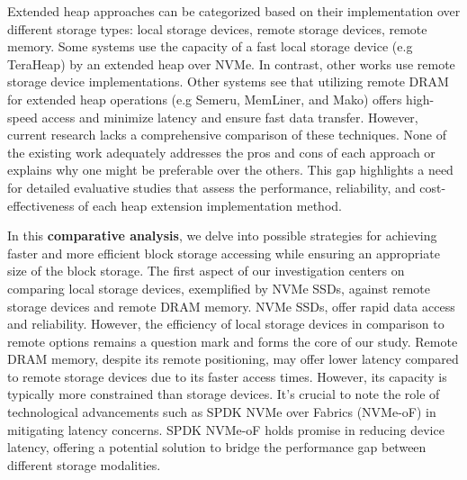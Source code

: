 \documentclass[nonacm,sigplan]{acmart}
\begin{document}
\par Extended heap approaches can be categorized based on their implementation over
different storage types: local storage devices, remote storage devices, remote memory. Some systems use the capacity of a fast local storage device (e.g TeraHeap) by an extended heap over NVMe. In contrast, other works use remote storage device
implementations. Other systems see that utilizing remote DRAM for
extended heap operations (e.g Semeru, MemLiner, and Mako) offers high-speed
access and minimize latency and ensure fast data transfer. However, current research lacks a comprehensive comparison of these
techniques. None of the existing work adequately addresses the pros and cons of
each approach or explains why one might be preferable over the others. This gap
highlights a need for detailed evaluative studies that assess the performance,
reliability, and cost-effectiveness of each heap extension implementation
method.




\par In this \textbf{comparative analysis}, we delve into possible strategies for
achieving faster and more efficient block storage accessing while ensuring an
appropriate size of the block storage. The first aspect of our investigation
centers on comparing local storage devices, exemplified by NVMe SSDs, against
remote storage devices and remote DRAM memory. NVMe SSDs, offer rapid data
access and reliability. However, the efficiency of local storage devices in
comparison to remote options remains a question mark and forms the core of our
study. Remote DRAM memory, despite its remote positioning, may offer lower
latency compared to remote storage devices due to its faster access times.
However, its capacity is typically more constrained than storage devices. It's
crucial to note the role of technological advancements such as SPDK NVMe over
Fabrics (NVMe-oF) in mitigating latency concerns. SPDK NVMe-oF holds promise in
reducing device latency, offering a potential solution to bridge the performance
gap between different storage modalities. 
\end{document}
